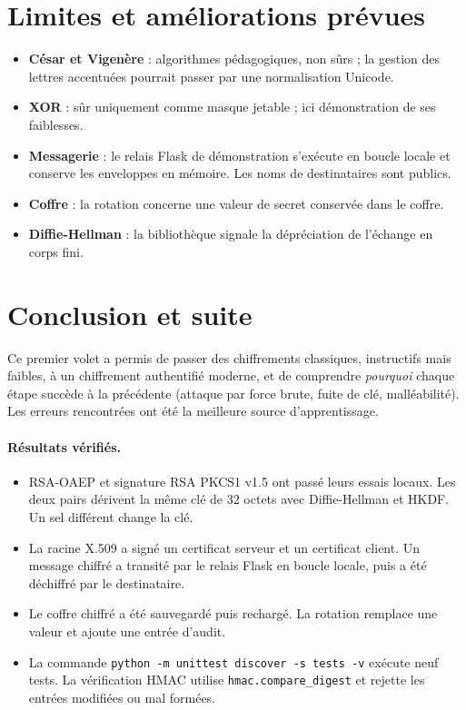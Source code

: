 \documentclass[11pt,a4paper]{article}
\begin{document}
\section{Limites et am\'eliorations pr\'evues}
\begin{itemize}
  \item \textbf{C\'esar et Vigen\`ere} : algorithmes p\'edagogiques, non s\^urs ; la gestion des lettres accentu\'ees
        pourrait passer par une normalisation Unicode.
  \item \textbf{XOR} : s\^ur uniquement comme masque jetable ; ici d\'emonstration de ses faiblesses.
  \item \textbf{Messagerie} : le relais Flask de d\'emonstration s'ex\'ecute en boucle locale et conserve les
        enveloppes en m\'emoire. Les noms de destinataires sont publics.
  \item \textbf{Coffre} : la rotation concerne une valeur de secret conserv\'ee dans le coffre.
  \item \textbf{Diffie-Hellman} : la biblioth\`eque signale la d\'epr\'eciation de l'\'echange en corps fini.
\end{itemize}

\section{Conclusion et suite}
Ce premier volet a permis de passer des chiffrements classiques, instructifs mais faibles, \`a un chiffrement
authentifi\'e moderne, et de comprendre \emph{pourquoi} chaque \'etape succ\`ede \`a la pr\'ec\'edente
(attaque par force brute, fuite de cl\'e, mall\'eabilit\'e). Les erreurs rencontr\'ees ont \'et\'e
la meilleure source d'apprentissage.

\paragraph{R\'esultats v\'erifi\'es.}
\begin{itemize}
  \item RSA-OAEP et signature RSA PKCS1 v1.5 ont pass\'e leurs essais locaux. Les deux pairs d\'erivent la
        m\^eme cl\'e de 32 octets avec Diffie-Hellman et HKDF. Un sel diff\'erent change la cl\'e.
  \item La racine X.509 a sign\'e un certificat serveur et un certificat client. Un message chiffr\'e
        a transit\'e par le relais Flask en boucle locale, puis a \'et\'e d\'echiffr\'e par le destinataire.
  \item Le coffre chiffr\'e a \'et\'e sauvegard\'e puis recharg\'e. La rotation remplace une valeur et
        ajoute une entr\'ee d'audit.
  \item La commande \texttt{python -m unittest discover -s tests -v} ex\'ecute neuf tests. La v\'erification
        HMAC utilise \texttt{hmac.compare\_digest} et rejette les entr\'ees modifi\'ees ou mal form\'ees.
\end{itemize}
\end{document}

